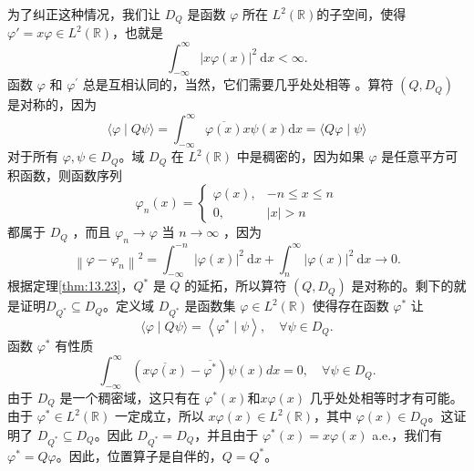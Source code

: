\begin{eg}
为了纠正这种情况，我们让 \(D_{Q}\) 是函数 \(\varphi\) 所在 \(L^{2}(\mathbb{R})\)的子空间，使得\(\varphi'=x\varphi \in L^{2}(\mathbb{R})\)，也就是
\[\int_{-\infty}^{\infty}|x \varphi(x)|^{2} \mathrm{~d} x<\infty .\]
函数 \(\varphi\) 和 \(\varphi^{\prime}\) 总是互相认同的，当然，它们需要几乎处处相等 。算符 \(\left(Q, D_{Q}\right) \) 是对称的，因为
\[
\langle\varphi \mid Q \psi\rangle=\int_{-\infty}^{\infty} \overline{\varphi(x)} x \psi(x) \mathrm{d} x=\langle Q \varphi \mid \psi\rangle
\]
对于所有 \(\varphi, \psi \in D_{Q}\)。域 \(D_{Q}\) 在 \(L^{2}(\mathbb{R})\) 中是稠密的，因为如果 \(\varphi\) 是任意平方可积函数，则函数序列
\[
\varphi_{n}(x)=\begin{cases}
\varphi(x), & -n \leq x \leq n \\
0, & |x|>n
\end{cases}
\]
都属于 \(D_{Q}\) ，而且 \(\varphi_{n} \rightarrow \varphi\) 当 \(n \rightarrow \infty\) ，因为
\[
\left\|\varphi-\varphi_{n}\right\|^{2}=\int_{-\infty}^{-n}|\varphi(x)|^{2} \mathrm{~d} x+\int_{n}^{\infty}|\varphi(x)|^{2} \mathrm{~d} x \rightarrow 0 .
\]
根据定理\ref{thm:13.23}，\(Q^{*}\) 是 \(Q\) 的延拓，所以算符 \(\left(Q, D_{Q}\right)\) 是对称的。剩下的就是证明\(D_{Q^{*}}\subseteq D_{Q}\)。定义域 \(D_{Q^{*}}\) 是函数集 \(\varphi \in L^{2}(\mathbb{R})\) 使得存在函数 \(\varphi^ {*}\) 让
\[
\langle\varphi \mid Q \psi\rangle=\left\langle\varphi^{*} \mid \psi\right\rangle, \quad \forall \psi \in D_{Q} .
\]
函数 \(\varphi^{*}\) 有性质
\[
\int_{-\infty}^{\infty}\left(\overline{x \varphi(x)}-\overline{\varphi^{*}}\right) \psi(x) d x=0, \quad \forall \psi \in D_{Q} .
\]
由于 \(D_{Q}\) 是一个稠密域，这只有在 \(\varphi^{*}(x)\)和\(x \varphi(x)\) 几乎处处相等时才有可能。由于 \(\varphi^{*} \in L^{2}(\mathbb{R})\) 一定成立，所以 \(x \varphi(x) \in L^{2}(\mathbb{R })\)，其中 \(\varphi(x) \in D_{Q}\)。这证明了 \(D_{Q^{*}} \subseteq D_{Q}\)。因此 \(D_{Q^{*}}=D_{Q}\)，并且由于 \(\varphi^{*}(x)=x \varphi(x)\) a.e.，我们有 \(\varphi^ {*}=Q \varphi\)。因此，位置算子是自伴的，\(Q=Q^{*}\)。

\end{eg}
